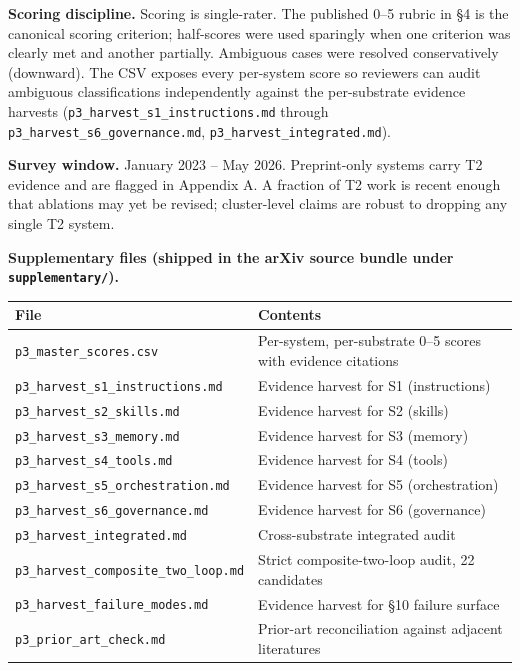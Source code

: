 \documentclass[
]{article}
\newcounter{none} %
\begin{document}
\textbf{Scoring discipline.} Scoring is single-rater. The published 0--5
rubric in §4 is the canonical scoring criterion; half-scores were used
sparingly when one criterion was clearly met and another partially.
Ambiguous cases were resolved conservatively (downward). The CSV exposes
every per-system score so reviewers can audit ambiguous classifications
independently against the per-substrate evidence harvests
(\texttt{p3\_harvest\_s1\_instructions.md} through
\texttt{p3\_harvest\_s6\_governance.md},
\texttt{p3\_harvest\_integrated.md}).

\textbf{Survey window.} January 2023 -- May 2026. Preprint-only systems
carry T2 evidence and are flagged in Appendix A. A fraction of T2 work
is recent enough that ablations may yet be revised; cluster-level claims
are robust to dropping any single T2 system.

\textbf{Supplementary files (shipped in the arXiv source bundle under
\texttt{supplementary/}).}

{\def\LTcaptype{none} %
\begin{longtable}[]{@{}
  >{\raggedright\arraybackslash}p{}
  >{\raggedright\arraybackslash}p{}@{}}
\toprule\noalign{}
\begin{minipage}[b]{\linewidth}\raggedright
File
\end{minipage} & \begin{minipage}[b]{\linewidth}\raggedright
Contents
\end{minipage} \\
\midrule\noalign{}
\endhead
\bottomrule\noalign{}
\endlastfoot
\texttt{p3\_master\_scores.csv} & Per-system, per-substrate 0--5 scores
with evidence citations \\
\texttt{p3\_harvest\_s1\_instructions.md} & Evidence harvest for S1
(instructions) \\
\texttt{p3\_harvest\_s2\_skills.md} & Evidence harvest for S2
(skills) \\
\texttt{p3\_harvest\_s3\_memory.md} & Evidence harvest for S3
(memory) \\
\texttt{p3\_harvest\_s4\_tools.md} & Evidence harvest for S4 (tools) \\
\texttt{p3\_harvest\_s5\_orchestration.md} & Evidence harvest for S5
(orchestration) \\
\texttt{p3\_harvest\_s6\_governance.md} & Evidence harvest for S6
(governance) \\
\texttt{p3\_harvest\_integrated.md} & Cross-substrate integrated
audit \\
\texttt{p3\_harvest\_composite\_two\_loop.md} & Strict
composite-two-loop audit, 22 candidates \\
\texttt{p3\_harvest\_failure\_modes.md} & Evidence harvest for §10
failure surface \\
\texttt{p3\_prior\_art\_check.md} & Prior-art reconciliation against
adjacent literatures \\
\end{longtable}
}
\end{document}
